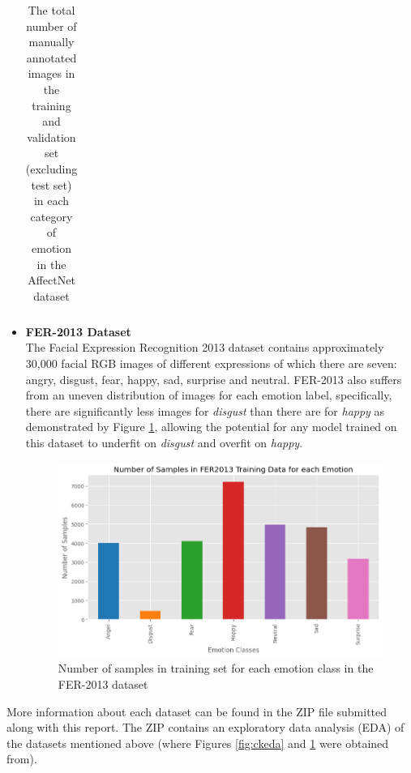 \documentclass[12pt, a4paper]{article}
\newcommand{\np}
    {
    \vskip 0.4cm
    }
\begin{document}
\begin{itemize}
\begin{table}[H]
\begin{tabular}{|P{3.5cm}|p{9.2cm}|}
        \end{tabular}
        \caption{The total number of manually annotated images in the training and validation set (excluding test set) in each category of emotion in the AffectNet dataset}
        \label{tab:an}
    \end{table}

    \item \textbf{FER-2013 Dataset} \citep{goodfellow2013challenges} \\ The Facial Expression Recognition 2013 dataset contains approximately 30,000 facial RGB images of different expressions of which there are seven: angry, disgust, fear, happy, sad, surprise and neutral. FER-2013 also suffers from an uneven distribution of images for each emotion label, specifically, there are significantly less images for \textit{disgust} than there are for \textit{happy} as demonstrated by Figure \ref{fig:fereda}, allowing the potential for any model trained on this dataset to underfit on \textit{disgust} and overfit on \textit{happy}.
    \np
    \begin{figure}[H]
        \centering
        \includegraphics[scale=0.60]{images/fereda.png}
        \caption{Number of samples in training set for each emotion class in the FER-2013 dataset}
        \label{fig:fereda}
    \end{figure}

\end{itemize}

More information about each dataset can be found in the ZIP file submitted along with this report. The ZIP contains an exploratory data analysis (EDA) of the datasets mentioned above (where Figures \ref{fig:ckeda} and \ref{fig:fereda} were obtained from).


\end{document}
